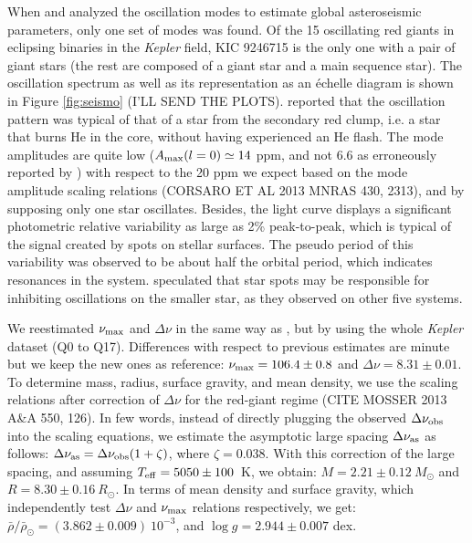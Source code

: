 When \citet{gau13} and \citet{gau14} analyzed the oscillation modes to estimate global asteroseismic parameters, only one set of modes was found. Of the 15 oscillating red giants in eclipsing binaries in the \emph{Kepler} field, KIC 9246715 is the only one with a pair of giant stars (the rest are composed of a giant star and a main sequence star). The oscillation spectrum as well as its representation as an \'echelle diagram is shown in Figure \ref{fig:seismo} (I'LL SEND THE PLOTS). \citealt{gau14} reported that the oscillation pattern was typical of that of a star from the secondary red clump, i.e. a star that burns He in the core, without having experienced an He flash. The mode amplitudes are quite low ($A_{\rm{max}}(l=0) \simeq 14$ ppm, and not 6.6 as erroneously reported by \citealt{gau14}) with respect to the 20 ppm we expect  based on the mode amplitude scaling relations (CORSARO ET AL 2013 MNRAS 430, 2313), and by supposing only one star oscillates. Besides, the light curve displays a significant photometric relative variability as large as 2\% peak-to-peak, which is typical of the signal created by spots on stellar surfaces. The pseudo period of this variability was observed to be about half the orbital period, which indicates resonances in the system. \citet{gau14} speculated that star spots may be responsible for inhibiting oscillations on the smaller star, as they observed on other five systems. 

We reestimated $\nu_{\rm{max}}$ and $\Delta\nu$ in the same way as \citet{gau14}, but by using the whole \textit{Kepler} dataset (Q0 to Q17). Differences with respect to previous estimates are minute but we keep the new ones as reference: $\nu_{\rm{max}} = 106.4 \pm 0.8$ and $\Delta\nu=8.31\pm0.01$. To determine mass, radius, surface gravity, and mean density, we use the scaling relations after correction of $\Delta\nu$ for the red-giant regime (CITE MOSSER 2013 A\&A 550, 126). In few words, instead of directly plugging the observed $\Delta\nu_{\rm{obs}}$ into the scaling equations, we estimate the asymptotic large spacing $\Delta\nu_{\rm{as}}$ as follows: $\Delta\nu_{\rm{as}} = \Delta\nu_{\rm{obs}} (1 + \zeta)$, where $\zeta = 0.038$. With this correction of the large spacing, and assuming $T_{\rm{eff}} = 5050 \pm 100$~K, we obtain: $M = 2.21 \pm 0.12 \ M_{\odot}$ and $R = 8.30 \pm 0.16 \ R_{\odot}$. In terms of mean density and surface gravity, which independently test $\Delta\nu$  and $\nu_{\rm{max}}$ relations respectively, we get:  $\bar{\rho}/\bar{\rho}_{\odot} = (3.862 \pm 0.009)\ 10 ^{-3}$, and $\log g = 2.944 \pm 0.007$ dex. 

